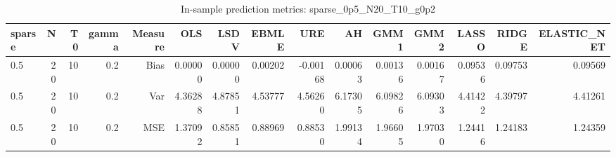 \begin{table}[!htbp]\centering
\caption{In-sample prediction metrics: sparse_0p5_N20_T10_g0p2}
\label{tab:table2_sparse_0p5_N20_T10_g0p2}
\begin{tabular}{lrrrrrrrrrrrrrr}
\hline
sparse & N & T0 & gamma & Measure & OLS & LSDV & EBMLE & URE & AH & GMM1 & GMM2 & LASSO & RIDGE & ELASTIC_NET \\
\hline
0.5 & 20 & 10 & 0.2 & Bias & 0.00000 & 0.00000 & 0.00202 & -0.00168 & 0.00063 & 0.00136 & 0.00167 & 0.09536 & 0.09753 & 0.09569 \\
0.5 & 20 & 10 & 0.2 & Var & 4.36288 & 4.87851 & 4.53777 & 4.56260 & 6.17305 & 6.09826 & 6.09303 & 4.41422 & 4.39797 & 4.41261 \\
0.5 & 20 & 10 & 0.2 & MSE & 1.37092 & 0.85851 & 0.88969 & 0.88530 & 1.99134 & 1.96605 & 1.97030 & 1.24416 & 1.24183 & 1.24359 \\
\hline
\end{tabular}
\end{table}

